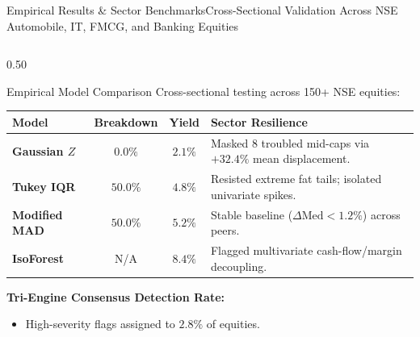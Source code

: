 \begin{frame}{Empirical Results \& Sector Benchmarks}{Cross-Sectional Validation Across NSE Automobile, IT, FMCG, and Banking Equities}
    \vspace{-0.2cm}
    \begin{columns}[T]
        \begin{column}{0.50\textwidth}
            \begin{quantcard}[height=5.55cm]{Empirical Model Comparison}
                \fontsize{5.8pt}{7.2pt}\selectfont
                Cross-sectional testing across 150+ NSE equities:
                \vspace{2pt}

                \renewcommand{\arraystretch}{1.25}
                \begin{tabularx}{\linewidth}{>{\bfseries}l c c >{\raggedright\arraybackslash}X}
                    \toprule
                    \textbf{\color{deepemerald}Model} & \textbf{\color{deepemerald}Breakdown} & \textbf{\color{deepemerald}Yield} & \textbf{\color{deepemerald}Sector Resilience} \\
                    \midrule
                    Gaussian $Z$ & $0.0\%$ & $2.1\%$ & Masked 8 troubled mid-caps via $+32.4\%$ mean displacement. \\
                    \rowcolor{minttint!35}
                    Tukey IQR & $50.0\%$ & $4.8\%$ & Resisted extreme fat tails; isolated univariate spikes. \\
                    \rowcolor{lightsage!50}
                    Modified MAD & $50.0\%$ & $5.2\%$ & Stable baseline ($\Delta \text{Med} < 1.2\%$) across peers. \\
                    \rowcolor{mintborder!20}
                    IsoForest & N/A & $8.4\%$ & Flagged multivariate cash-flow/margin decoupling. \\
                    \bottomrule
                \end{tabularx}

                \vspace{3pt}
                \textbf{\color{deepemerald}Tri-Engine Consensus Detection Rate:}
                \begin{itemize}
                    \setlength{\itemsep}{1pt}
                    \item High-severity flags assigned to $2.8\%$ of equities.
                \end{itemize}
                \vfill
            \end{quantcard}
        \end{column}


\end{columns}
\end{frame}

